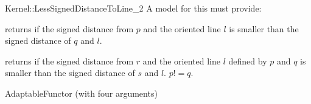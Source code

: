 \begin{ccRefFunctionObjectConcept}{Kernel::LessSignedDistanceToLine_2}
A model for this must provide:


{
returns  if the signed distance from $p$ and the oriented line $l$ 
is smaller than the signed distance of $q$ and $l$.
}

{
returns  if the signed distance from $r$ and the oriented line $l$ 
defined by $p$ and $q$ is smaller than the signed distance of $s$ and $l$.
\ccPrecond $p != q$.
}

\ccRefines
AdaptableFunctor (with four arguments)

\ccSeeAlso
{}\\

\end{ccRefFunctionObjectConcept}
